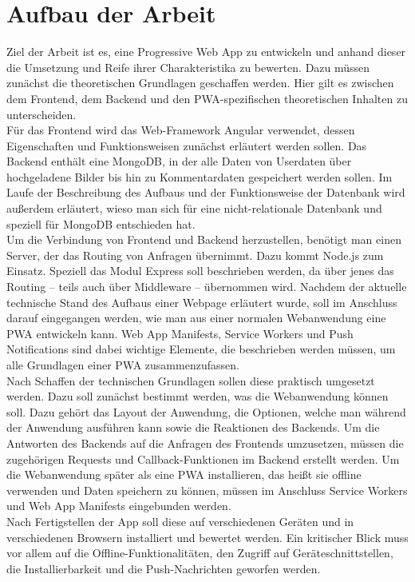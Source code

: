 \section{Aufbau der Arbeit}\label{se:AufbauDerArbeit}
Ziel der Arbeit ist es, eine Progressive Web App zu entwickeln und anhand dieser die Umsetzung und Reife ihrer Charakteristika zu bewerten. 
Dazu müssen zunächst die theoretischen Grundlagen geschaffen werden. Hier gilt es zwischen dem Frontend, dem Backend und den PWA-spezifischen theoretischen Inhalten zu unterscheiden.\\
Für das Frontend wird das Web-Framework Angular verwendet, dessen Eigenschaften und Funktionsweisen zunächst erläutert werden sollen. Das Backend enthält eine MongoDB, in der alle Daten von Userdaten über hochgeladene Bilder bis hin zu Kommentardaten gespeichert werden sollen. Im Laufe der Beschreibung des Aufbaus und der Funktionsweise der Datenbank wird außerdem erläutert, wieso man sich für eine nicht-relationale Datenbank und speziell für MongoDB entschieden hat.\\
Um die Verbindung von Frontend und Backend herzustellen, benötigt man einen Server, der das Routing von Anfragen übernimmt. Dazu kommt Node.js zum Einsatz. Speziell das Modul Express soll beschrieben werden, da über jenes das Routing – teils auch über Middleware – übernommen wird.
Nachdem der aktuelle technische Stand des Aufbaus einer Webpage erläutert wurde, soll im Anschluss darauf eingegangen werden, wie man aus einer normalen Webanwendung eine PWA entwickeln kann. Web App Manifests, Service Workers und Push Notifications sind dabei wichtige Elemente, die beschrieben werden müssen, um alle Grundlagen einer PWA zusammenzufassen. \\
Nach Schaffen der technischen Grundlagen sollen diese praktisch umgesetzt werden. Dazu soll zunächst bestimmt werden, was die Webanwendung können soll. Dazu gehört das Layout der Anwendung, die Optionen, welche man während der Anwendung ausführen kann sowie die Reaktionen des Backends. Um die Antworten des Backends auf die Anfragen des Frontends umzusetzen, müssen die zugehörigen Requests und Callback-Funktionen im Backend erstellt werden. Um die Webanwendung später als eine PWA installieren, das heißt sie offline verwenden und Daten speichern zu können, müssen im Anschluss Service Workers und Web App Manifests eingebunden werden.\\
Nach Fertigstellen der App soll diese auf verschiedenen Geräten und in verschiedenen Browsern installiert und bewertet werden. Ein kritischer Blick muss vor allem auf die Offline-Funktionalitäten, den Zugriff auf Geräteschnittstellen, die Installierbarkeit und die Push-Nachrichten geworfen werden. 
